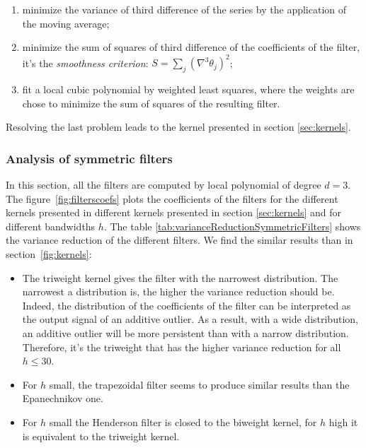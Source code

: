 \documentclass[
  12pt,
  ,
  a4paper]{article}
\providecommand{\tightlist}{%
  \setlength{\itemsep}{0pt}\setlength{\parskip}{0pt}}
\newcommand\1{\mathds{1}}
\begin{document}
\begin{enumerate}
\def\labelenumi{\arabic{enumi}.}
\tightlist
\item
  minimize the variance of third difference of the series by the application of the moving average;\\
\item
  minimize the sum of squares of third difference of the coefficients of the filter, it's the \emph{smoothness criterion}: \(S=\sum_j(\nabla^{3}\theta_{j})^{2}\);\\
\item
  fit a local cubic polynomial by weighted least squares, where the weights are chose to minimize the sum of squares of the resulting filter.
\end{enumerate}

Resolving the last problem leads to the kernel presented in section \ref{sec:kernels}.

\hypertarget{analysis-of-symmetric-filters}{%
\subsubsection{Analysis of symmetric filters}\label{analysis-of-symmetric-filters}}

In this section, all the filters are computed by local polynomial of degree \(d=3\).
The figure~\ref{fig:filterscoefs} plots the coefficients of the filters for the different kernels presented in different kernels presented in section \ref{sec:kernels} and for different bandwidths \(h\).
The table \ref{tab:varianceReductionSymmetricFilters} shows the variance reduction of the different filters.
We find the similar results than in section~\ref{fig:kernels}:

\begin{itemize}
\item
  The triweight kernel gives the filter with the narrowest distribution.
  The narrowest a distribution is, the higher the variance reduction should be.
  Indeed, the distribution of the coefficients of the filter can be interpreted as the output signal of an additive outlier.
  As a result, with a wide distribution, an additive outlier will be more persistent than with a narrow distribution.
  Therefore, it's the triweight that has the higher variance reduction for all \(h\leq30\).
\item
  For \(h\) small, the trapezoidal filter seems to produce similar results than the Epanechnikov one.
\item
  For \(h\) small the Henderson filter is closed to the biweight kernel, for \(h\) high it is equivalent to the triweight kernel.
\end{itemize}
\end{document}
